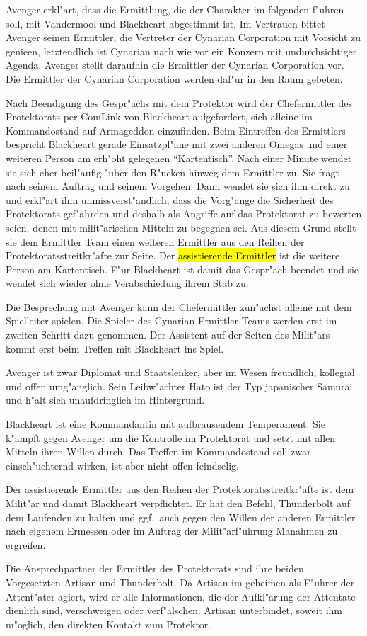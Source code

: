 Avenger erkl"art, dass die Ermittlung, die der Charakter im folgenden f"uhren soll, mit Vandermool und Blackheart abgestimmt ist. Im Vertrauen bittet Avenger seinen Ermittler, die Vertreter der Cynarian Corporation mit Vorsicht zu genie\3en, letztendlich ist Cynarian nach wie vor ein Konzern mit undurchsichtiger Agenda. Avenger stellt daraufhin die Ermittler der Cynarian Corporation vor. Die Ermittler der Cynarian Corporation werden daf"ur in den Raum gebeten.

Nach Beendigung des Gespr"achs mit dem Protektor wird der Chefermittler des Protektorats per ComLink von Blackheart aufgefordert, sich alleine im Kommandostand auf Armageddon einzufinden. Beim Eintreffen des Ermittlers bespricht Blackheart gerade Einsatzpl"ane mit zwei anderen Omegas und einer weiteren Person am erh"oht gelegenen "`Kartentisch"'. Nach einer Minute wendet sie sich eher beil"aufig "uber den R"ucken hinweg dem Ermittler zu. Sie fragt nach seinem Auftrag und seinem Vorgehen. Dann wendet sie sich ihm direkt zu und erkl"art ihm unmissverst"andlich, dass die Vorg"ange die Sicherheit des Protektorats gef"ahrden und deshalb als Angriffe auf das Protektorat zu bewerten seien, denen mit milit"arischen Mitteln zu begegnen sei. Aus diesem Grund stellt sie dem Ermittler Team einen weiteren Ermittler aus den Reihen der Protektoratsstreitkr"afte zur Seite. Der \hl{assistierende Ermittler} ist die weitere Person am Kartentisch. F"ur Blackheart ist damit das Gespr"ach beendet und sie wendet sich wieder ohne Verabschiedung ihrem Stab zu.
\vfill

\begin{remarks}
	Die Besprechung mit Avenger kann der Chefermittler zun"achst alleine mit dem Spielleiter spielen. Die Spieler des Cynarian Ermittler Teams werden erst im zweiten Schritt dazu genommen. Der Assistent auf der Seiten des Milit"ars kommt erst beim Treffen mit Blackheart ins Spiel.
	
	Avenger ist zwar Diplomat und Staatslenker, aber im Wesen freundlich, kollegial und offen umg"anglich. Sein Leibw"achter Hato ist der Typ japanischer Samurai und h"alt sich unaufdringlich im Hintergrund.
	
	Blackheart ist eine Kommandantin mit aufbrausendem Temperament. Sie k"ampft gegen Avenger um die Kontrolle im Protektorat und setzt mit allen Mitteln ihren Willen durch. Das Treffen im Kommandostand soll zwar einsch"uchternd wirken, ist aber nicht offen feindselig.
	
	Der assistierende Ermittler aus den Reihen der Protektoratsstreitkr"afte ist dem Milit"ar und damit Blackheart verpflichtet. Er hat den Befehl, Thunderbolt auf dem Laufenden zu halten und ggf.~auch gegen den Willen der anderen Ermittler nach eigenem Ermessen oder im Auftrag der Milit"arf"uhrung Ma\3nahmen zu ergreifen.

	Die Ansprechpartner der Ermittler des Protektorats sind ihre beiden Vorgesetzten Artisan und Thunderbolt. Da Artisan im geheimen als F"uhrer der Attent"ater agiert, wird er alle Informationen, die der Aufkl"arung der Attentate dienlich sind, verschweigen oder verf"alschen. Artisan unterbindet, soweit ihm m"oglich, den direkten Kontakt zum Protektor.
\end{remarks}

